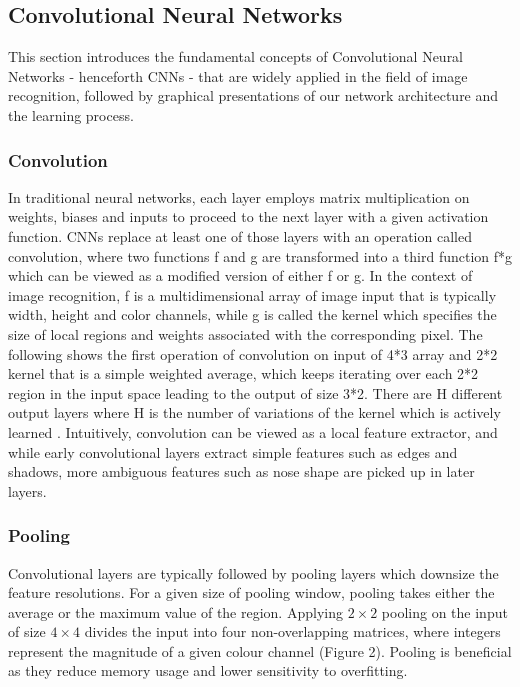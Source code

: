 \documentclass[11pt,titlepage,oneside,openany]{article}
\begin{document}
\subsection{Convolutional Neural Networks}
This section introduces the fundamental concepts of Convolutional Neural Networks - henceforth CNNs - that are widely applied in the field of image recognition, followed by graphical presentations of our network architecture and the learning process. 

\subsubsection*{Convolution}
In traditional neural networks, each layer employs matrix multiplication on weights, biases and inputs to proceed to the next layer with a given activation function. CNNs replace at least one of those layers with an operation called convolution, where two functions f and g are transformed into a third function f*g which can be viewed as a modified version of either f or g. In the context of image recognition, f is a multidimensional array of image input that is typically width, height and color channels, while g is called the kernel which specifies the size of local regions and weights associated with the corresponding pixel. The following shows the first operation of convolution on input of 4*3 array and 2*2 kernel that is a simple weighted average, which keeps iterating over each 2*2 region in the input space leading to the output of size 3*2. There are H different output layers where H is the number of variations of the kernel which is actively learned \cite{G16}. Intuitively, convolution can be viewed as a local feature extractor, and while early convolutional layers extract simple features such as edges and shadows, more ambiguous features such as nose shape are picked up in later layers.

\subsubsection*{Pooling}
Convolutional layers are typically followed by pooling layers which downsize the feature resolutions. For a given size of pooling window, pooling takes either the average or the maximum value of the region. Applying $2\times2$ pooling on the input of size $4\times4$ divides the input into four non-overlapping matrices, where integers represent the magnitude of a given colour channel (Figure 2). Pooling is beneficial as they reduce memory usage and lower sensitivity to overfitting.
\end{document}
